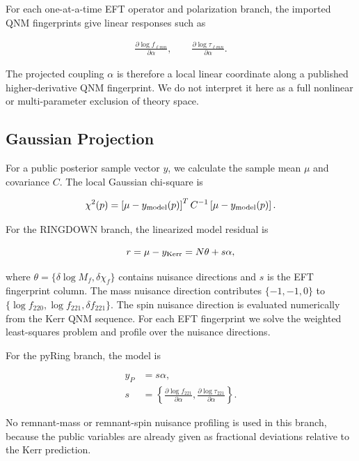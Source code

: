 \documentclass[aps,prd,10pt,twocolumn,nofootinbib,superscriptaddress]{revtex4-2}
\begin{document}
For each one-at-a-time EFT operator and polarization branch, the imported QNM
fingerprints give linear responses such as

\begin{align}
\frac{\partial \log f_{\ell mn}}{\partial \alpha},\qquad
\frac{\partial \log \tau_{\ell mn}}{\partial \alpha}.
\end{align}

The projected coupling $\alpha$ is therefore a local linear coordinate along a
published higher-derivative QNM fingerprint. We do not interpret it here as a
full nonlinear or multi-parameter exclusion of theory space.

\subsection{Gaussian Projection}

For a public posterior sample vector $y$, we calculate the sample mean $\mu$ and
covariance $C$. The local Gaussian chi-square is

\begin{equation}
\chi^2(p)=\left[\mu-y_{\rm model}(p)\right]^T C^{-1}\left[\mu-y_{\rm model}(p)\right].
\end{equation}

For the RINGDOWN branch, the linearized model residual is

\begin{equation}
r=\mu-y_{\rm Kerr}=N\theta+s\alpha,
\end{equation}

where $\theta=\{\delta\log M_f,\delta\chi_f\}$ contains nuisance directions and
$s$ is the EFT fingerprint column. The mass nuisance direction contributes
$\{-1,-1,0\}$ to $\{\log f_{220},\log f_{221},\delta f_{221}\}$. The spin nuisance direction
is evaluated numerically from the Kerr QNM sequence. For each EFT fingerprint
we solve the weighted least-squares problem and profile over the nuisance
directions.

For the pyRing branch, the model is

\begin{align}
y_P&=s\alpha,\\
s&=\left\{\frac{\partial\log f_{221}}{\partial\alpha},
\frac{\partial\log\tau_{221}}{\partial\alpha}\right\}.
\end{align}

No remnant-mass or remnant-spin nuisance profiling is used in this branch,
because the public variables are already given as fractional deviations
relative to the Kerr prediction.
\end{document}
